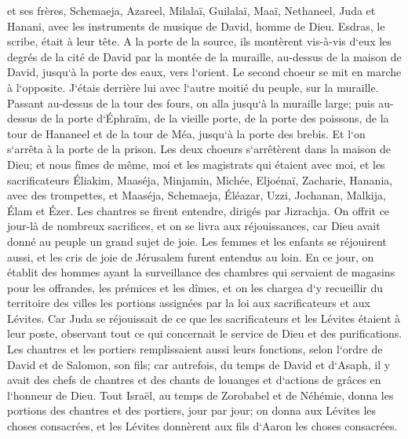 \verse et ses frères, Schemaeja, Azareel, Milalaï, Guilalaï, Maaï, Nethaneel, Juda et Hanani, avec les instruments de musique de David, homme de Dieu. Esdras, le scribe, était à leur tête. 
\verse A la porte de la source, ils montèrent vis-à-vis d`eux les degrés de la cité de David par la montée de la muraille, au-dessus de la maison de David, jusqu`à la porte des eaux, vers l`orient. 
\verse Le second choeur se mit en marche à l`opposite. J`étais derrière lui avec l`autre moitié du peuple, sur la muraille. Passant au-dessus de la tour des fours, on alla jusqu`à la muraille large; 
\verse puis au-dessus de la porte d`Éphraïm, de la vieille porte, de la porte des poissons, de la tour de Hananeel et de la tour de Méa, jusqu`à la porte des brebis. Et l`on s`arrêta à la porte de la prison. 
\verse Les deux choeurs s`arrêtèrent dans la maison de Dieu; et nous fîmes de même, moi et les magistrats qui étaient avec moi, 
\verse et les sacrificateurs Éliakim, Maaséja, Minjamin, Michée, Eljoénaï, Zacharie, Hanania, avec des trompettes, 
\verse et Maaséja, Schemaeja, Éléazar, Uzzi, Jochanan, Malkija, Élam et Ézer. Les chantres se firent entendre, dirigés par Jizrachja. 
\verse On offrit ce jour-là de nombreux sacrifices, et on se livra aux réjouissances, car Dieu avait donné au peuple un grand sujet de joie. Les femmes et les enfants se réjouirent aussi, et les cris de joie de Jérusalem furent entendus au loin. 
\verse En ce jour, on établit des hommes ayant la surveillance des chambres qui servaient de magasins pour les offrandes, les prémices et les dîmes, et on les chargea d`y recueillir du territoire des villes les portions assignées par la loi aux sacrificateurs et aux Lévites. Car Juda se réjouissait de ce que les sacrificateurs et les Lévites étaient à leur poste, 
\verse observant tout ce qui concernait le service de Dieu et des purifications. Les chantres et les portiers remplissaient aussi leurs fonctions, selon l`ordre de David et de Salomon, son fils; 
\verse car autrefois, du temps de David et d`Asaph, il y avait des chefs de chantres et des chants de louanges et d`actions de grâces en l`honneur de Dieu. 
\verse Tout Israël, au temps de Zorobabel et de Néhémie, donna les portions des chantres et des portiers, jour par jour; on donna aux Lévites les choses consacrées, et les Lévites donnèrent aux fils d`Aaron les choses consacrées. 

